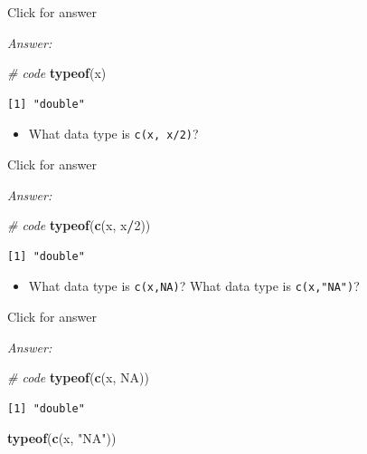 \documentclass[
]{book}
\newenvironment{Shaded}{\begin{snugshade}}{\end{snugshade}}
\newcommand{\CommentTok}[1]{\textcolor[rgb]{0.56,0.35,0.01}{\textit{#1}}}
\newcommand{\ConstantTok}[1]{\textcolor[rgb]{0.56,0.35,0.01}{#1}}
\newcommand{\DecValTok}[1]{\textcolor[rgb]{0.00,0.00,0.81}{#1}}
\newcommand{\FunctionTok}[1]{\textcolor[rgb]{0.13,0.29,0.53}{\textbf{#1}}}
\newcommand{\NormalTok}[1]{#1}
\newcommand{\SpecialCharTok}[1]{\textcolor[rgb]{0.81,0.36,0.00}{\textbf{#1}}}
\newcommand{\StringTok}[1]{\textcolor[rgb]{0.31,0.60,0.02}{#1}}
\providecommand{\tightlist}{%
  \setlength{\itemsep}{0pt}\setlength{\parskip}{0pt}}
\begin{document}
Click for answer

\emph{Answer:}

\begin{Shaded}
\begin{Highlighting}[]
\CommentTok{\# code}
\FunctionTok{typeof}\NormalTok{(x)}
\end{Highlighting}
\end{Shaded}

\begin{verbatim}
[1] "double"
\end{verbatim}

\begin{itemize}
\tightlist
\item
  What data type is \texttt{c(x,\ x/2)}?
\end{itemize}

Click for answer

\emph{Answer:}

\begin{Shaded}
\begin{Highlighting}[]
\CommentTok{\# code}
\FunctionTok{typeof}\NormalTok{(}\FunctionTok{c}\NormalTok{(x, x}\SpecialCharTok{/}\DecValTok{2}\NormalTok{))}
\end{Highlighting}
\end{Shaded}

\begin{verbatim}
[1] "double"
\end{verbatim}

\begin{itemize}
\tightlist
\item
  What data type is \texttt{c(x,NA)}? What data type is \texttt{c(x,"NA")}?
\end{itemize}

Click for answer

\emph{Answer:}

\begin{Shaded}
\begin{Highlighting}[]
\CommentTok{\# code}
\FunctionTok{typeof}\NormalTok{(}\FunctionTok{c}\NormalTok{(x, }\ConstantTok{NA}\NormalTok{))}
\end{Highlighting}
\end{Shaded}

\begin{verbatim}
[1] "double"
\end{verbatim}

\begin{Shaded}
\begin{Highlighting}[]
\FunctionTok{typeof}\NormalTok{(}\FunctionTok{c}\NormalTok{(x, }\StringTok{"NA"}\NormalTok{))}
\end{Highlighting}
\end{Shaded}
\end{document}
